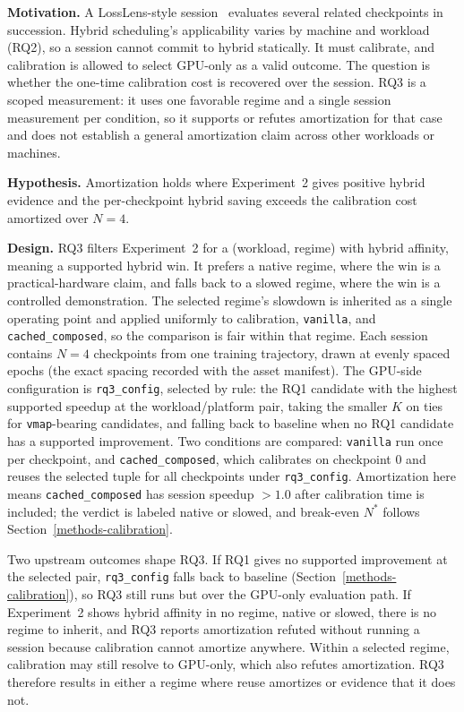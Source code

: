 \textbf{Motivation.} A LossLens-style
session~\cite{xie2025losslens} evaluates several related
checkpoints in succession. Hybrid scheduling's applicability
varies by machine and workload (RQ2), so a session cannot commit to hybrid statically. It must
calibrate, and calibration is allowed to select GPU-only as
a valid outcome. The question is whether the one-time
calibration cost is recovered over the session. RQ3 is a
scoped measurement: it uses one favorable regime and a
single session measurement per condition, so it supports or
refutes amortization for that case and does not establish a
general amortization claim across other workloads or machines.

\textbf{Hypothesis.} Amortization holds where Experiment~2
gives positive hybrid evidence and the per-checkpoint
hybrid saving exceeds the calibration cost amortized over
$N=4$.

\textbf{Design.} RQ3 filters Experiment~2 for a
(workload, regime) with hybrid affinity, meaning a supported
hybrid win. It prefers a native regime, where the win is a
practical-hardware claim, and falls back to a slowed regime,
where the win is a controlled demonstration. The selected
regime's slowdown is inherited as a single operating point and
applied uniformly to calibration, \texttt{vanilla}, and
\texttt{cached\_composed}, so the comparison is fair within
that regime. Each session contains $N=4$ checkpoints from one
training trajectory, drawn at evenly spaced epochs (the exact
spacing recorded with the asset manifest). The GPU-side
configuration is \texttt{rq3\_config}, selected by rule: the
RQ1 candidate with the highest supported speedup at the
workload/platform pair, taking the smaller $K$ on ties for
\texttt{vmap}-bearing candidates, and falling back to baseline
when no RQ1 candidate has a supported improvement. Two
conditions are compared: \texttt{vanilla} run once per
checkpoint, and \texttt{cached\_composed}, which calibrates on
checkpoint $0$ and reuses the selected tuple for all
checkpoints under \texttt{rq3\_config}. Amortization here means
\texttt{cached\_composed} has session speedup $>1.0$ after
calibration time is included; the verdict is labeled native or
slowed, and break-even $N^{*}$ follows
Section~\ref{methods-calibration}.

Two upstream outcomes shape RQ3. If RQ1 gives no supported
improvement at the selected pair, \texttt{rq3\_config} falls
back to baseline (Section~\ref{methods-calibration}), so RQ3
still runs but over the GPU-only evaluation path. If
Experiment~2 shows hybrid affinity in no regime, native or
slowed, there is no regime to inherit, and RQ3 reports
amortization refuted without running a session because
calibration cannot amortize anywhere. Within a selected regime,
calibration may still resolve to GPU-only, which also refutes
amortization. RQ3 therefore results in either a regime where
reuse amortizes or evidence that it does not.
